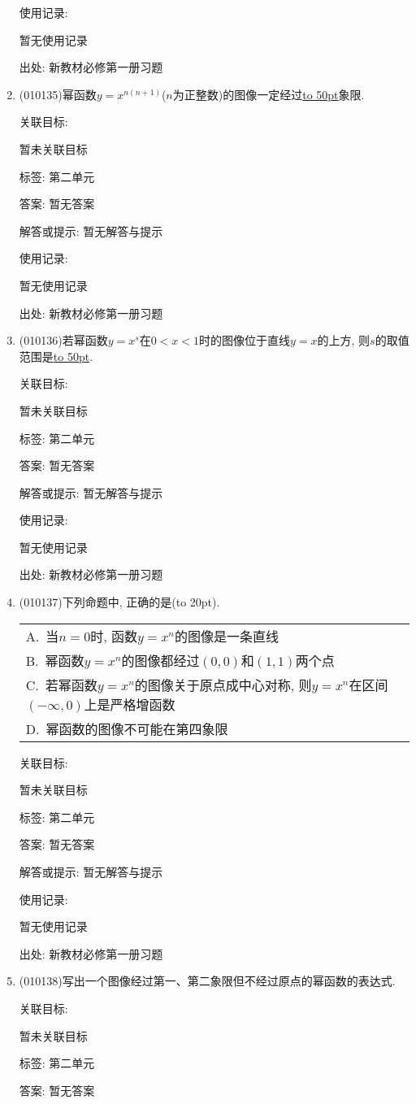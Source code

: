 \documentclass[10pt,a4paper]{article}
\newcommand{\blank}[1]{\underline{\hbox to #1pt{}}}
\newcommand{\bracket}[1]{(\hbox to #1pt{})}
\newcommand{\onech}[4]{\par\begin{tabular}{p{.9\textwidth}}
A.~#1\\
B.~#2\\
C.~#3\\
D.~#4
\end{tabular}}
\begin{document}
\begin{enumerate}[1.]
使用记录:

暂无使用记录


出处: 新教材必修第一册习题
\item { (010135)}幂函数$y=x^{n(n+1)}$($n$为正整数)的图像一定经过\blank{50}象限.


关联目标:

暂未关联目标



标签: 第二单元

答案: 暂无答案

解答或提示: 暂无解答与提示

使用记录:

暂无使用记录


出处: 新教材必修第一册习题
\item { (010136)}若幂函数$y=x^s$在$0<x<1$时的图像位于直线$y=x$的上方, 则$s$的取值范围是\blank{50}.


关联目标:

暂未关联目标



标签: 第二单元

答案: 暂无答案

解答或提示: 暂无解答与提示

使用记录:

暂无使用记录


出处: 新教材必修第一册习题
\item { (010137)}下列命题中, 正确的是\bracket{20}.
\onech{当$n=0$时, 函数$y=x^n$的图像是一条直线}{幂函数$y=x^n$的图像都经过$(0, 0)$和$(1, 1)$两个点}{若幂函数$y=x^n$的图像关于原点成中心对称, 则$y=x^n$在区间$(-\infty, 0)$上是严格增函数}{幂函数的图像不可能在第四象限}


关联目标:

暂未关联目标



标签: 第二单元

答案: 暂无答案

解答或提示: 暂无解答与提示

使用记录:

暂无使用记录


出处: 新教材必修第一册习题
\item { (010138)}写出一个图像经过第一、第二象限但不经过原点的幂函数的表达式.


关联目标:

暂未关联目标



标签: 第二单元

答案: 暂无答案


\end{enumerate}
\end{document}
